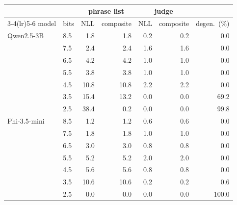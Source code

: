 \begin{tabular}{llrrrrr}
\toprule
& & \multicolumn{2}{c}{phrase list} & \multicolumn{2}{c}{judge} & \\
\cmidrule(lr){3-4}\cmidrule(lr){5-6}
model & bits & NLL & composite & NLL & composite & degen.\ (\%) \\
\midrule
Qwen2.5-3B & 8.5 & 1.8 & 1.8 & 0.2 & 0.2 & 0.0 \\
 & 7.5 & 2.4 & 2.4 & 1.6 & 1.6 & 0.0 \\
 & 6.5 & 4.2 & 4.2 & 1.0 & 1.0 & 0.0 \\
 & 5.5 & 3.8 & 3.8 & 1.0 & 1.0 & 0.0 \\
 & 4.5 & 10.8 & 10.8 & 2.2 & 2.2 & 0.0 \\
 & 3.5 & 15.4 & 13.2 & 0.0 & 0.0 & 69.2 \\
 & 2.5 & 38.4 & 0.2 & 0.0 & 0.0 & 99.8 \\
\addlinespace
Phi-3.5-mini & 8.5 & 1.2 & 1.2 & 0.6 & 0.6 & 0.0 \\
 & 7.5 & 1.8 & 1.8 & 1.0 & 1.0 & 0.0 \\
 & 6.5 & 3.0 & 3.0 & 0.8 & 0.8 & 0.0 \\
 & 5.5 & 5.2 & 5.2 & 2.0 & 2.0 & 0.0 \\
 & 4.5 & 5.6 & 5.6 & 0.8 & 0.8 & 0.0 \\
 & 3.5 & 10.6 & 10.6 & 0.2 & 0.2 & 0.6 \\
 & 2.5 & 0.0 & 0.0 & 0.0 & 0.0 & 100.0 \\
\bottomrule
\end{tabular}
